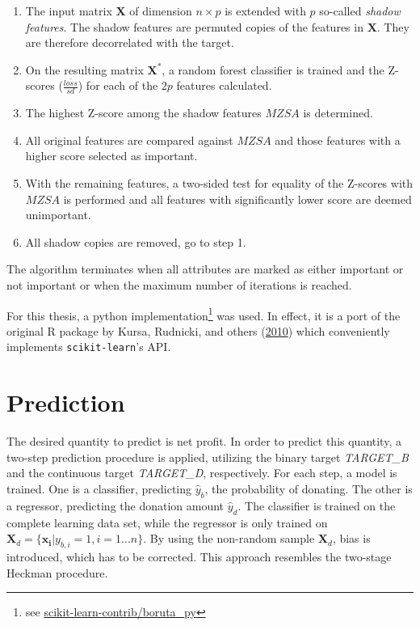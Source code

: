 \documentclass[
  11pt,
  a4paper,
  DIV=12,captions=tableheading,oneside,titlepage=firstiscover,abstracton]{scrreprt}
\providecommand{\tightlist}{%
  \setlength{\itemsep}{0pt}\setlength{\parskip}{0pt}}
\providecommand{\tightlist}{%
  \setlength{\itemsep}{0pt}\setlength{\parskip}{0pt}}
\begin{document}
\begin{enumerate}
\def\labelenumi{\arabic{enumi}.}
\tightlist
\item
  The input matrix \(\mathbf{X}\) of dimension \(n \times p\) is extended with \(p\) so-called \emph{shadow features}. The shadow features are permuted copies of the features in \(\mathbf{X}\). They are therefore decorrelated with the target.
\item
  On the resulting matrix \(\mathbf{X^*}\), a random forest classifier is trained and the Z-scores (\(\frac{\bar{loss}}{sd}\)) for each of the \(2p\) features calculated.
\item
  The highest Z-score among the shadow features \(MZSA\) is determined.
\item
  All original features are compared against \(MZSA\) and those features with a higher score selected as important.
\item
  With the remaining features, a two-sided test for equality of the Z-scores with \(MZSA\) is performed and all features with significantly lower score are deemed unimportant.
\item
  All shadow copies are removed, go to step 1.
\end{enumerate}

The algorithm terminates when all attributes are marked as either important or not important or when the maximum number of iterations is reached.

For this thesis, a python implementation\footnote{see \href{https://github.com/scikit-learn-contrib/boruta_py}{scikit-learn-contrib/boruta\_py}} was used. In effect, it is a port of the original R package by Kursa, Rudnicki, and others (\protect\hyperlink{ref-kursa2010boruta}{2010}) which conveniently implements \texttt{scikit-learn}'s API.

\hypertarget{methods-prediction}{%
\section{Prediction}\label{methods-prediction}}

The desired quantity to predict is net profit. In order to predict this quantity, a two-step prediction procedure is applied, utilizing the binary target \emph{TARGET\_B} and the continuous target \emph{TARGET\_D}, respectively. For each step, a model is trained. One is a classifier, predicting \(\hat{y}_b\), the probability of donating. The other is a regressor, predicting the donation amount \(\hat{y}_d\). The classifier is trained on the complete learning data set, while the regressor is only trained on \(\mathbf{X}_d = \{\mathbf{x_i}|y_{b,i} = 1, i=1...n\}\). By using the non-random sample \(\mathbf{X}_d\), bias is introduced, which has to be corrected. This approach resembles the two-stage Heckman procedure.
\end{document}
